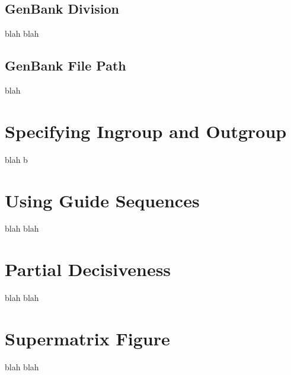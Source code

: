 \documentclass[12pt]{report}
\begin{document}
\subsection{GenBank Division}
blah blah
\subsection{GenBank File Path}
blah

\section{Specifying Ingroup and Outgroup}

blah b

\section{Using Guide Sequences}
blah blah

\section{Partial Decisiveness}
blah blah

\section{Supermatrix Figure}
blah blah
\end{document}
